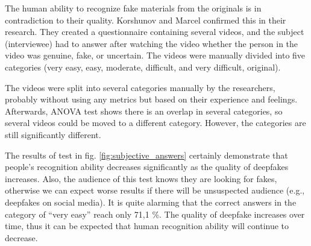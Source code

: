 The human ability to recognize fake materials from the originals is in contradiction to their quality. Korshunov and Marcel \cite{TheThreatOfDeepfakes} confirmed this in their research. They created a questionnaire containing several videos, and the subject (interviewee) had to answer after watching the video whether the person in the video was genuine, fake, or uncertain. The videos were manually divided into five categories (very easy, easy, moderate, difficult, and very difficult, original). 

The videos were split into several categories manually by the researchers, probably without using any metrics but based on their experience and feelings. Afterwards, ANOVA test shows there is an overlap in several categories, so several videos could be moved to a different category. However, the categories are still significantly different.

The results of test in fig. \ref{fig:subjective_answers} certainly demonstrate that people's recognition ability decreases significantly as the quality of deepfakes increases. Also, the audience of this test knows they are looking for fakes, otherwise we can expect worse results if there will be unsuspected audience (e.g., deepfakes on social media). It is quite alarming that the correct answers in the category of “very easy” reach only 71,1 \%. The quality of deepfake increases over time, thus it can be expected that human recognition ability will continue to decrease. \cite{TheThreatOfDeepfakes}

